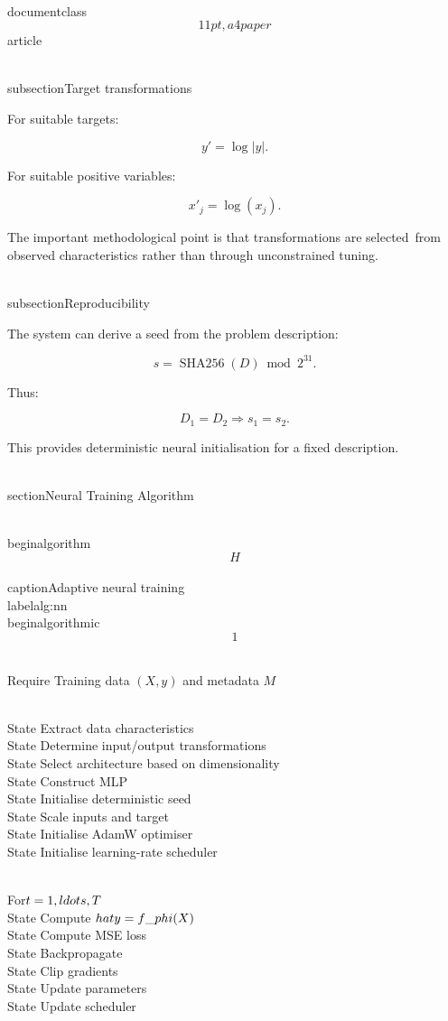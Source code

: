 \\documentclass\[11pt,a4paper\]{article}
\begin{document}
 \\subsection{Target transformations}

 For suitable targets:

 $$
y'=\log|y|.
$$

 For suitable positive variables:

 $$
x'_j=\log(x_j).
$$

 The important methodological point is that transformations are selected\
 from observed characteristics rather than through unconstrained tuning.

 \\subsection{Reproducibility}

 The system can derive a seed from the problem description:

 $$
s=
\operatorname{SHA256}(D)\bmod2^{31}.
$$

 Thus:

 $$
D_1=D_2
\Rightarrow
s_1=s_2.
$$

 This provides deterministic neural initialisation for a fixed description.

 \\section{Neural Training Algorithm}\

 \\begin{algorithm}\[H\]\
 \\caption{Adaptive neural training}\
 \\label{alg:nn}\
 \\begin{algorithmic}\[1\]

 \\Require Training data $(X,y)$ and metadata $M$

 \\State Extract data characteristics\
 \\State Determine input/output transformations\
 \\State Select architecture based on dimensionality\
 \\State Construct MLP\
 \\State Initialise deterministic seed\
 \\State Scale inputs and target\
 \\State Initialise AdamW optimiser\
 \\State Initialise learning-rate scheduler

 \\For{$t=1,\\ldots,T$}\
 \\State Compute $\\hat y=f\_\\phi(X)$\
 \\State Compute MSE loss\
 \\State Backpropagate\
 \\State Clip gradients\
 \\State Update parameters\
 \\State Update scheduler
\end{document}
